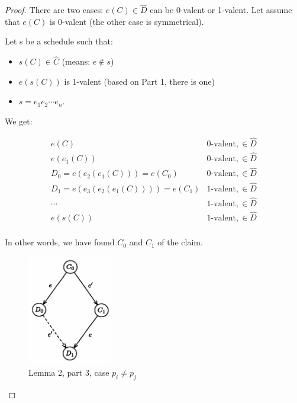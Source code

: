 \documentclass[a4paper,11pt,hidelinks]{article}
\begin{document}
\begin{proof}
    There are two cases: $e(C) \in \hat{D}$ can be 0-valent or 1-valent. Let assume that $e(C)$ is 0-valent (the other case is symmetrical).

    Let s be a schedule such that:
    \begin{itemize}
        \item $s(C) \in \hat{C}$ (means: $e \notin s$)
        \item $e(s(C))$ is 1-valent (based on Part 1, there is one)
        \item $s = e_1 e_2 \cdots e_n$.
    \end{itemize}

    We get:

    \[
        \begin{array}{ll}
            e(C)                               & \text{0-valent}, \in \hat{D} \\
            e(e_1(C))                          & \text{0-valent}, \in \hat{D} \\
            D_0 = e(e_2(e_1(C))) = e(C_0)      & \text{0-valent}, \in \hat{D} \\
            D_1 = e(e_3(e_2(e_1(C)))) = e(C_1) & \text{1-valent}, \in \hat{D} \\
            \cdots                             & \text{1-valent}, \in \hat{D} \\
            e(s(C))                            & \text{1-valent}, \in \hat{D} \\
        \end{array}
    \]

    In other words, we have found $C_0$ and $C_1$ of the claim.

    \begin{figure}[!ht]
        \centering
        \includegraphics[width=0.33\textwidth]{drawable/fig2.png}
        \caption{Lemma 2, part 3, case $p_i \ne p_j$}
        \label{fig2}
    \end{figure}


\end{proof}
\end{document}
